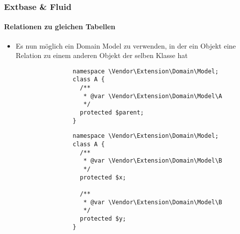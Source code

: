 %

\begin{frame}[fragile]
	\frametitle{Extbase \& Fluid}
	\framesubtitle{Relationen zu gleichen Tabellen}

	\lstset{basicstyle=\tiny\ttfamily}

	\begin{itemize}

		\item Es nun möglich ein Domain Model zu verwenden, in der ein Objekt eine
			Relation zu einem anderen Objekt der selben Klasse hat

			\begin{lstlisting}
				namespace \Vendor\Extension\Domain\Model;
				class A {
				  /**
				   * @var \Vendor\Extension\Domain\Model\A
				   */
				  protected $parent;
				}
			\end{lstlisting}

			\begin{lstlisting}
				namespace \Vendor\Extension\Domain\Model;
				class A {
				  /**
				   * @var \Vendor\Extension\Domain\Model\B
				   */
				  protected $x;

				  /**
				   * @var \Vendor\Extension\Domain\Model\B
				   */
				  protected $y;
				}
			\end{lstlisting}

	\end{itemize}

\end{frame}


